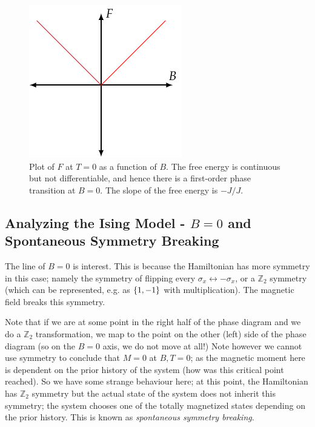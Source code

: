 \begin{figure}[htbp]
    \centering
    \includegraphics{Images/fig-FT0Ising.pdf}
    
    \caption{Plot of $F$ at $T = 0$ as a function of $B$. The free energy is continuous but not differentiable, and hence there is a first-order phase transition at $B = 0$. The slope of the free energy is $-J/J$.}
    \label{fig-FT0Ising}
\end{figure}

\subsection{Analyzing the Ising Model - $B = 0$ and Spontaneous Symmetry Breaking}
The line of $B = 0$ is interest. This is because the Hamiltonian has more symmetry in this case; namely the symmetry of flipping every $\sigma_x \leftrightarrow -\sigma_x$, or a $\mathbb{Z}_2$ symmetry (which can be represented, e.g. as $\set{1, -1}$ with multiplication). The magnetic field breaks this symmetry.

Note that if we are at some point in the right half of the phase diagram and we do a $\mathbb{Z}_2$ transformation, we map to the point on the other (left) side of the phase diagram (so on the $B = 0$ axis, we do not move at all!) Note however we cannot use symmetry to conclude that $M = 0$ at $B, T = 0$; as the magnetic moment here is dependent on the prior history of the system (how was this critical point reached). So we have some strange behaviour here; at this point, the Hamiltonian has $\mathbb{Z}_2$ symmetry but the actual state of the system does not inherit this symmetry; the system chooses one of the totally magnetized states depending on the prior history. This is known as \emph{spontaneous symmetry breaking}.

